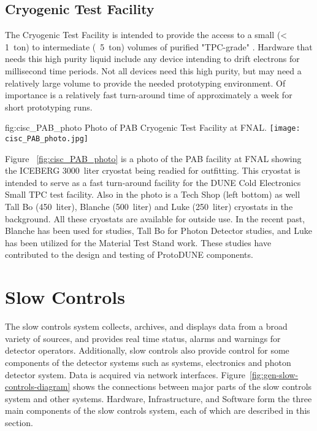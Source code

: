\subsection{Cryogenic Test Facility}

The Cryogenic Test Facility is intended to provide the access to a small (< \SI {1} {ton}) to intermediate (~\SI {5} {ton}) volumes of purified "TPC-grade" . Hardware that needs this high purity liquid include any device intending to drift electrons for millisecond time periods. Not all devices need this high purity, but may need a relatively large volume to provide the needed prototyping environment. Of importance is a relatively fast turn-around time of approximately a week for short prototyping runs. 

\begin{dunefigure}{fig:cisc_PAB_photo}
  {Photo of PAB Cryogenic Test Facility at FNAL.}
  \texttt{[image: cisc\_PAB\_photo.jpg]}
\end{dunefigure}

Figure ~\ref{fig:cisc_PAB_photo} is a photo of the PAB facility at FNAL showing the ICEBERG \SI {3000} {liter} cryostat being readied for outfitting. This cryostat is intended to serve as a fast turn-around facility for the DUNE Cold Electronics Small TPC test facility. Also in the photo is a Tech Shop (left bottom) as well Tall Bo (\SI {450} {liter}), Blanche (\SI {500} {liter}) and Luke (\SI {250} {liter}) cryostats in the background. All these cryostats are available for outside use. In the recent past, Blanche has been used for  studies, Tall Bo for Photon Detector studies, and Luke has been utilized for the Material Test Stand work. These studies have contributed to the design and testing of ProtoDUNE  components.



\section{Slow Controls}

The slow controls system collects, archives, and displays data from
a broad variety of sources, and provides real time status, alarms and warnings for detector operators. Additionally, slow controls also provide control for some components of the detector systems such as  systems,  electronics and photon detector system. Data is acquired via network interfaces.  Figure~\ref{fig:gen-slow-controls-diagram} shows the
connections between major parts of the slow controls system and other systems. Hardware, Infrastructure, and Software form the three main components of the slow controls system, each of which are described in this section.

